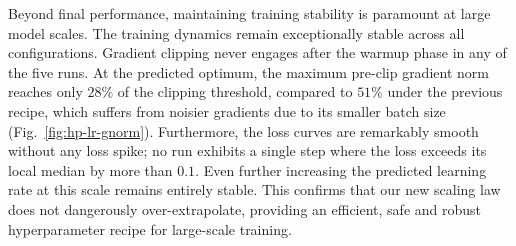 Beyond final performance, maintaining training stability is paramount at large model scales.
The training dynamics remain exceptionally stable across all configurations. 
Gradient clipping never engages after the warmup phase in any of the five runs. 
At the predicted optimum, the maximum pre-clip gradient norm reaches only $28\%$ of the clipping threshold, compared to $51\%$ under the previous recipe, which suffers from noisier gradients due to its smaller batch size (Fig.~\ref{fig:hp-lr-gnorm}). 
Furthermore, the loss curves are remarkably smooth without any loss spike; no run exhibits a single step where the loss exceeds its local median by more than $0.1$. 
Even further increasing the predicted learning rate at this scale remains entirely stable. 
This confirms that our new scaling law does not dangerously over-extrapolate, providing an efficient, safe and robust hyperparameter recipe for large-scale training.

